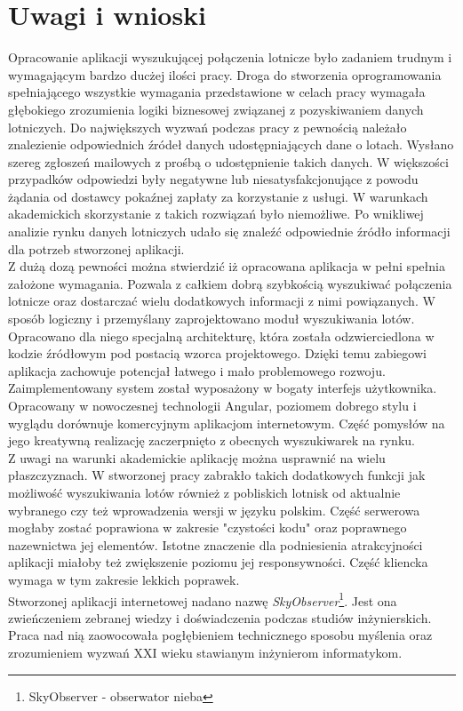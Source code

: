 \documentclass[12pt, twoside]{report}
\begin{document}
\chapter{Uwagi i wnioski}
Opracowanie aplikacji wyszukującej połączenia lotnicze było zadaniem trudnym i wymagającym bardzo ducżej ilości pracy. Droga do stworzenia oprogramowania spełniającego wszystkie wymagania przedstawione w celach pracy wymagała głębokiego zrozumienia logiki biznesowej związanej z pozyskiwaniem danych lotniczych. Do największych wyzwań podczas pracy z pewnością należało znalezienie odpowiednich źródeł danych udostępniających dane o lotach. Wysłano szereg zgłoszeń mailowych z prośbą o udostępnienie takich danych. W większości przypadków odpowiedzi były negatywne lub niesatysfakcjonujące z powodu żądania od dostawcy pokaźnej zapłaty za korzystanie z usługi. W warunkach akademickich skorzystanie z takich rozwiązań było niemożliwe. Po wnikliwej analizie rynku danych lotniczych udało się znaleźć odpowiednie źródło informacji dla potrzeb stworzonej aplikacji. \\ \indent
 Z dużą dozą pewności można stwierdzić iż opracowana aplikacja w pełni spełnia założone wymagania. Pozwala z całkiem dobrą szybkością wyszukiwać połączenia lotnicze oraz dostarczać wielu dodatkowych informacji z nimi powiązanych. W sposób logiczny i przemyślany zaprojektowano moduł wyszukiwania lotów. Opracowano dla niego specjalną architekturę, która została odzwierciedlona w kodzie źródłowym pod postacią wzorca projektowego. Dzięki temu zabiegowi aplikacja zachowuje potencjał łatwego i mało problemowego rozwoju. \\ \indent
Zaimplementowany system został wyposażony w bogaty interfejs użytkownika. Opracowany w nowoczesnej technologii Angular, poziomem dobrego stylu i wyglądu dorównuje komercyjnym aplikacjom internetowym. Część pomysłów na jego kreatywną realizację zaczerpnięto z obecnych wyszukiwarek na rynku. \\ \indent
Z uwagi na warunki akademickie aplikację można usprawnić na wielu płaszczyznach. W stworzonej pracy zabrakło takich dodatkowych funkcji jak możliwość wyszukiwania lotów również z pobliskich lotnisk od aktualnie wybranego czy też wprowadzenia wersji w języku polskim. Część serwerowa mogłaby zostać poprawiona w zakresie "czystości kodu" oraz poprawnego nazewnictwa jej elementów. Istotne znaczenie dla podniesienia atrakcyjności aplikacji miałoby też zwiększenie poziomu jej responsywności. Część kliencka wymaga w tym zakresie lekkich poprawek. \\ \indent
Stworzonej aplikacji internetowej nadano nazwę \textit{SkyObserver}\footnote{SkyObserver - obserwator nieba}. Jest ona zwieńczeniem zebranej wiedzy i doświadczenia podczas studiów inżynierskich. Praca nad nią zaowocowała pogłębieniem technicznego sposobu myślenia oraz zrozumieniem wyzwań XXI wieku stawianym inżynierom informatykom.
\end{document}
